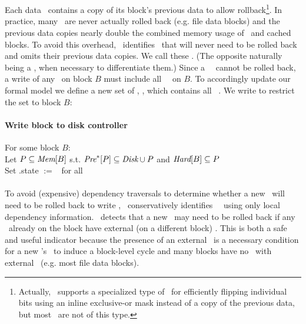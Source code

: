 \subsection{\Nrb\ \ChDescs}
\label{sec:chdescs:nrb}

Each data \chdesc\ contains a copy of its block's previous data to
allow rollback\footnote{Actually, \Kudos\ supports a specialized type of \chdesc\ for
efficiently flipping individual bits using an inline exclusive-or mask instead
of a copy of the previous data, but most \chdescs\ are not of this type.}.
%
In practice, many \chdesc\ are never actually rolled back (e.g. file
data blocks)
%
and the previous data copies nearly double the combined memory usage of
\chdescs\ and cached blocks.
%
To avoid this overhead, \Kudos\ identifies \chdescs\ that will never
need to be rolled back and omits their previous data copies. We call
these \emph{\nrb} \chdescs. (The opposite naturally being a \emph{\rb}
\chdesc, when necessary to differentiate them.)
%
Since a \nrb\ \chdesc\ cannot be rolled back, a write of any \chdescs\
on block $B$ must include all \nrb\ \chdescs\ on $B$. To accordingly
update our formal model we define a new set of \chdescs, \ChNrb, which
contains all \nrb\ \chdescs. We write \ChNrbB{B} to restrict the set
to block $B$:

\paragraph{Write block to disk controller}
For some block $B$: \\
Let \(P \subseteq \textit{Mem}[B]\) s.t.
\(\textit{Pre}^*[P] \subseteq \textit{Disk} \cup P\) and \(\textit{Hard}[B] \subseteq P\) \\
Set \p{p}.state $:=$ \stateinf\ for all \inset{p}{P}

\paragraph{}
To avoid (expensive) dependency traversals to determine whether a new
\chdesc\ will need to be rolled back to write \ChAll,
%
\Kudos\ conservatively identifies \nrb\ \chdescs\ using only local
dependency information.
%
\Kudos\ detects that a new \chdesc\ may need to be rolled back if any
\chdescs\ already on the block have external (on a different
block)
\afters.
%
This is both a safe and useful indicator because
%
the presence of an external \after\ is a necessary condition for a new
\chdesc's \before\ to induce a block-level cycle
%
and many blocks have no \chdescs\ with external \afters\ (e.g. most
file data blocks).

